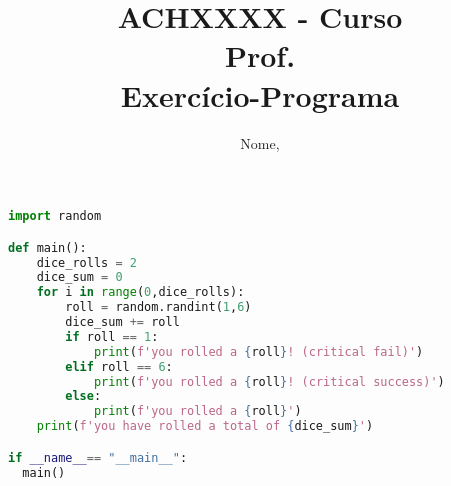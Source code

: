 \documentclass[12pt,a4paper]{article}
\begin{document}
\author{Nome,  }
\title{ACHXXXX - Curso \\
\large Prof.  \\
\large Exercício-Programa }
\maketitle

\begin{lstlisting}[language=Python]
import random

def main():
    dice_rolls = 2
    dice_sum = 0
    for i in range(0,dice_rolls):
        roll = random.randint(1,6)
        dice_sum += roll
        if roll == 1:
            print(f'you rolled a {roll}! (critical fail)')
        elif roll == 6:
            print(f'you rolled a {roll}! (critical success)')
        else:
            print(f'you rolled a {roll}')
    print(f'you have rolled a total of {dice_sum}')

if __name__== "__main__":
  main()
\end{lstlisting}
\end{document}
